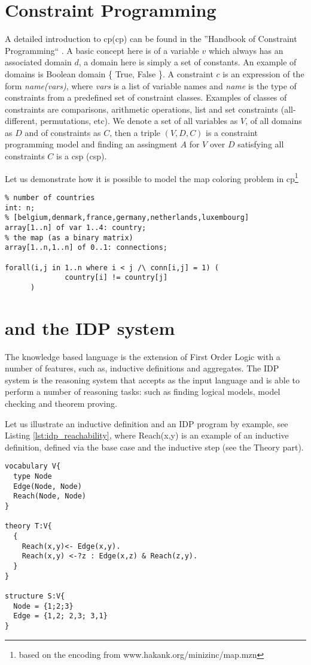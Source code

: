 \section{Constraint Programming}
A detailed introduction to \acrlong{cp}(\acrshort{cp}) can be found in the ''Handbook of Constraint Programming`` \cite{handbookcp}. A basic concept here is of a variable $v$ which always has an associated domain $d$, a domain here is simply a set of constants. An example of domains is Boolean domain \{ True, False \}. A constraint $c$ is an expression of the form \textit{name(vars)}, where \textit{vars} is a list of variable names and \textit{name} is the type of constraints from a predefined set of constraint classes. Examples of classes of constraints are comparisons,   arithmetic operations, list and set constraints (all-different, permutations, etc). We denote a set of all variables as $V$, of all domains as $D$ and of constraints as $C$, then a triple $(V,D,C)$ is a constraint programming model and finding an assingment $A$ for $V$ over $D$ satisfying all constraints $C$ is a \acrlong{csp} (\acrshort{csp}).

Let us demonstrate how it is possible to model the map coloring problem in \acrshort{cp}\footnote{based on the encoding from www.hakank.org/minizinc/map.mzn}
\begin{lstlisting}
% number of countries
int: n; 
% [belgium,denmark,france,germany,netherlands,luxembourg]
array[1..n] of var 1..4: country; 
% the map (as a binary matrix)
array[1..n,1..n] of 0..1: connections; 

forall(i,j in 1..n where i < j /\ conn[i,j] = 1) (
              country[i] != country[j]
      )
\end{lstlisting}



\section{\fod and the IDP system}
The knowledge based language \fod is the extension of First Order Logic with a number of features, such as, inductive definitions and aggregates. The IDP system \parencite{idppaper} is the reasoning system that accepts as the input \fod language and is able to perform a number of reasoning tasks: such as finding logical models, model checking and theorem proving.

Let us illustrate an inductive definition and an IDP program by example, see Listing \ref{lst:idp_reachability}, where Reach(x,y) is an example of an inductive definition, defined via the base case and the inductive step (see the Theory part).
\begin{lstlisting}[caption=An example of an inductive definition in FO(.) and of an IDP program,label=lst:idp_reachability]
vocabulary V{
  type Node
  Edge(Node, Node)
  Reach(Node, Node)
}

theory T:V{
  { 
    Reach(x,y)<- Edge(x,y).
    Reach(x,y) <-?z : Edge(x,z) & Reach(z,y).
  }
}

structure S:V{
  Node = {1;2;3}
  Edge = {1,2; 2,3; 3,1} 
}
\end{lstlisting}

